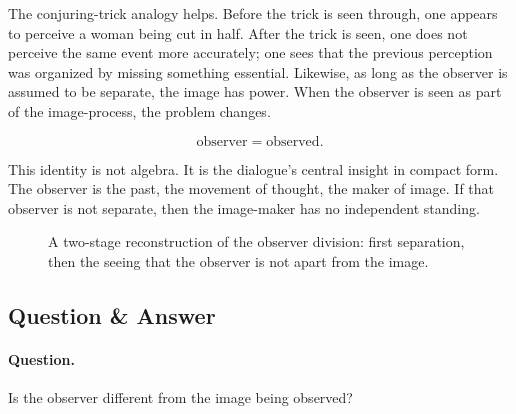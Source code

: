 The conjuring-trick analogy helps. Before the trick is seen through, one appears to perceive a woman being cut in half. After the trick is seen, one does not perceive the same event more accurately; one sees that the previous perception was organized by missing something essential. Likewise, as long as the observer is assumed to be separate, the image has power. When the observer is seen as part of the image-process, the problem changes.

\begin{equation}
\text{observer} = \text{observed}.
\end{equation}

This identity is not algebra. It is the dialogue's central insight in compact form. The observer is the past, the movement of thought, the maker of image. If that observer is not separate, then the image-maker has no independent standing.

\begin{figure}
\centering
{}
\caption{A two-stage reconstruction of the observer division: first separation, then the seeing that the observer is not apart from the image.}
\end{figure}

\subsection{Question \& Answer}

\paragraph{Question.}
Is the observer different from the image being observed?

